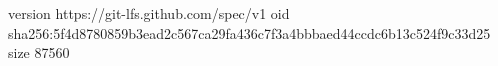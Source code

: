 version https://git-lfs.github.com/spec/v1
oid sha256:5f4d8780859b3ead2c567ca29fa436c7f3a4bbbaed44ccdc6b13c524f9c33d25
size 87560
